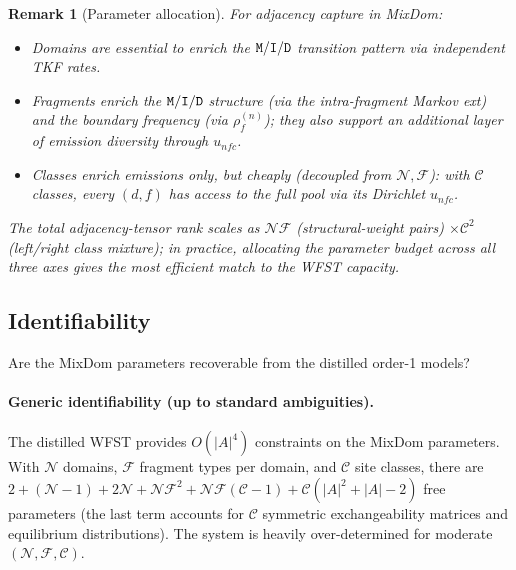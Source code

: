 \documentclass{article}
\newtheorem{remark}{Remark}
\newcommand\notext{\rho}
\newcommand\dom{n}
\newcommand\ndom{\mathcal{N}}
\newcommand\nfrag{\mathcal{F}}
\newcommand\classdist{u}
\newcommand\alphabet{A}
\newcommand\mat{{\tt M}}
\newcommand\ins{{\tt I}}
\newcommand\del{{\tt D}}
\newcommand\frag{f}
\newcommand\srcfrag{f}
\newcommand\class{c}
\newcommand\nclasses{\mathcal{C}}
\begin{document}
\begin{remark}[Parameter allocation]
For adjacency capture in MixDom:
\begin{itemize}[nosep]
\item Domains are essential to enrich the $\mat/\ins/\del$ transition
  pattern via independent TKF rates.
\item Fragments enrich the $\mat/\ins/\del$ structure (via the
  intra-fragment Markov ext) and the boundary frequency
  (via $\notext^{(\dom)}_\srcfrag$); they also support an additional
  layer of emission diversity through $\classdist_{\dom\frag\class}$.
\item Classes enrich emissions only, but cheaply (decoupled from
  $\ndom, \nfrag$): with $\nclasses$ classes, every $(d,f)$ has access
  to the full pool via its Dirichlet $\classdist_{\dom\frag\class}$.
\end{itemize}
The total adjacency-tensor rank scales as $\ndom \nfrag$
(structural-weight pairs) $\times \nclasses^2$ (left/right class mixture);
in practice, allocating the parameter budget across all three axes
gives the most efficient match to the WFST capacity.
\end{remark}


\subsection{Identifiability}
\label{sec:identifiability}

Are the MixDom parameters recoverable from the distilled order-1 models?

\paragraph{Generic identifiability (up to standard ambiguities).}
The distilled WFST provides $O(|\alphabet|^4)$ constraints on the
MixDom parameters. With $\ndom$ domains, $\nfrag$ fragment types per
domain, and $\nclasses$ site classes, there are
$2 + (\ndom-1) + 2\ndom + \ndom\nfrag^2 + \ndom\nfrag(\nclasses-1)
+ \nclasses(|\alphabet|^2 + |\alphabet| - 2)$ free parameters (the
last term accounts for $\nclasses$ symmetric exchangeability matrices
and equilibrium distributions). The system is heavily over-determined
for moderate $(\ndom, \nfrag, \nclasses)$.
\end{document}
